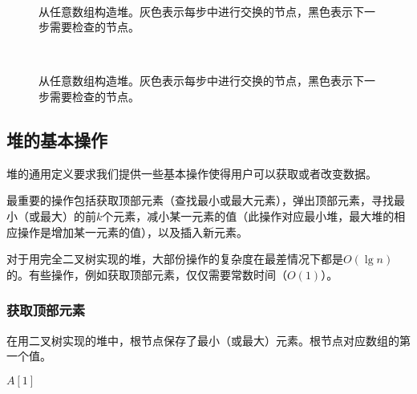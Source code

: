 \documentclass[UTF8]{article}
\begin{document}
\begin{figure}[htbp]
    \centering
     \\
    \caption{从任意数组构造堆。灰色表示每步中进行交换的节点，黑色表示下一步需要检查的节点。} \label{fig:build-heap-2}
\end{figure}

\begin{figure}[htbp]
    \centering
     \\
    \caption{从任意数组构造堆。灰色表示每步中进行交换的节点，黑色表示下一步需要检查的节点。} \label{fig:build-heap-3}
\end{figure}

\subsection{堆的基本操作}

堆的通用定义要求我们提供一些基本操作使得用户可以获取或者改变数据。

最重要的操作包括获取顶部元素（查找最小或最大元素），弹出顶部元素，寻找最小（或最大）的前$k$个元素，减小某一元素的值（此操作对应最小堆，最大堆的相应操作是增加某一元素的值），以及插入新元素。

对于用完全二叉树实现的堆，大部份操作的复杂度在最差情况下都是$O(\lg n)$的。有些操作，例如获取顶部元素，仅仅需要常数时间（$O(1)$）。

\subsubsection{获取顶部元素}

在用二叉树实现的堆中，根节点保存了最小（或最大）元素。根节点对应数组的第一个值。

\begin{algorithmic}[1]
  \State \Return $A[1]$
\EndFunction
\end{algorithmic}
\end{document}
